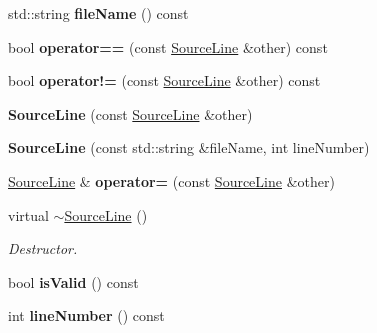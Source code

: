 \begin{DoxyCompactItemize}
\item 
\hypertarget{class_source_line_a1571a51d45ebcea382b86224ef767a2e}{std\+::string {\bfseries file\+Name} () const }\label{class_source_line_a1571a51d45ebcea382b86224ef767a2e}

\item 
\hypertarget{class_source_line_a6c9eff68161f364725b3a51fc60c3e01}{bool {\bfseries operator==} (const \hyperlink{class_source_line}{Source\+Line} \&other) const }\label{class_source_line_a6c9eff68161f364725b3a51fc60c3e01}

\item 
\hypertarget{class_source_line_aa4633f46f9c9f470c6b680327d002e86}{bool {\bfseries operator!=} (const \hyperlink{class_source_line}{Source\+Line} \&other) const }\label{class_source_line_aa4633f46f9c9f470c6b680327d002e86}

\item 
\hypertarget{class_source_line_a9fb221c8969d14c88b909af568ab91d5}{{\bfseries Source\+Line} (const \hyperlink{class_source_line}{Source\+Line} \&other)}\label{class_source_line_a9fb221c8969d14c88b909af568ab91d5}

\item 
\hypertarget{class_source_line_a2a6cc3b13b3e76b64475ba2e9aff29d0}{{\bfseries Source\+Line} (const std\+::string \&file\+Name, int line\+Number)}\label{class_source_line_a2a6cc3b13b3e76b64475ba2e9aff29d0}

\item 
\hypertarget{class_source_line_a25e0e26b31c067a85d008240764ed47e}{\hyperlink{class_source_line}{Source\+Line} \& {\bfseries operator=} (const \hyperlink{class_source_line}{Source\+Line} \&other)}\label{class_source_line_a25e0e26b31c067a85d008240764ed47e}

\item 
\hypertarget{class_source_line_afe82eb20dbe4291911d7e369b96b04aa}{virtual \hyperlink{class_source_line_afe82eb20dbe4291911d7e369b96b04aa}{$\sim$\+Source\+Line} ()}\label{class_source_line_afe82eb20dbe4291911d7e369b96b04aa}

\begin{DoxyCompactList}\small\item\em Destructor. \end{DoxyCompactList}\item 
\hypertarget{class_source_line_a4ebbbf64f2d1688803298dd83cba6c77}{bool {\bfseries is\+Valid} () const }\label{class_source_line_a4ebbbf64f2d1688803298dd83cba6c77}

\item 
\hypertarget{class_source_line_ada3cce7f748d6fedffc7f3e9a348bc54}{int {\bfseries line\+Number} () const }\label{class_source_line_ada3cce7f748d6fedffc7f3e9a348bc54}


\end{DoxyCompactItemize}
